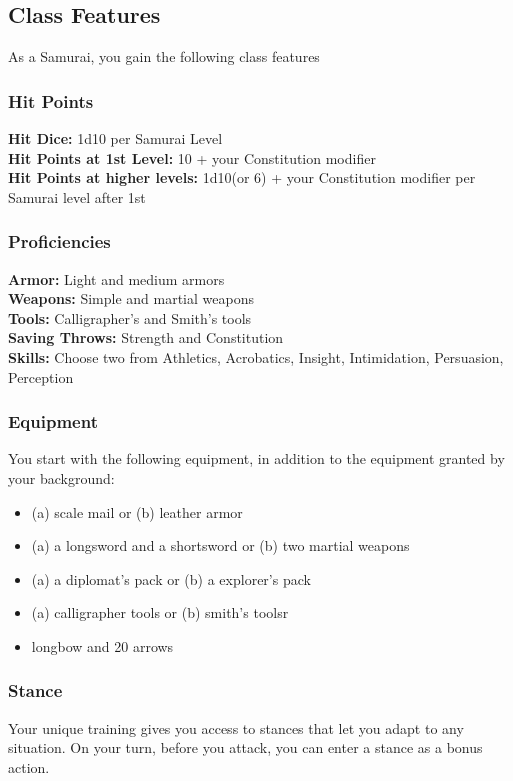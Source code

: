 \documentclass[letterpaper,twocolumn,openany,nodeprecatedcode]{dndbook}
\begin{document}
\newpage
\clearpage
\newpage
\subsection{Class Features}
As a Samurai, you gain the following class features
\subsubsection{Hit Points}
\textbf{Hit Dice:} 1d10 per Samurai Level\\
\textbf{Hit Points at 1st Level:} 10 + your Constitution modifier\\
\textbf{Hit Points at higher levels:} 1d10(or 6) + your Constitution modifier per Samurai level after 1st\\

\subsubsection{Proficiencies}
\textbf{Armor:} Light and medium armors\\
\textbf{Weapons:} Simple and martial weapons\\
\textbf{Tools:} Calligrapher's and Smith's tools\\
\textbf{Saving Throws:} Strength and Constitution\\
\textbf{Skills:} Choose two from Athletics, Acrobatics, Insight, Intimidation, Persuasion, Perception\\

\subsubsection{Equipment}
You start with the following equipment, in addition to the equipment granted by your background:
\begin{itemize}
    \item (a) scale mail or (b) leather armor
    \item (a) a longsword and a shortsword or (b) two martial weapons
    \item (a) a diplomat's pack or (b) a explorer's pack
    \item (a) calligrapher tools or (b) smith's toolsr
    \item longbow and 20 arrows
\end{itemize}

\subsubsection{Stance}
Your unique training gives you access to stances that let you adapt to any situation. On your turn, before
you attack, you can enter a stance as a bonus action.
\end{document}
